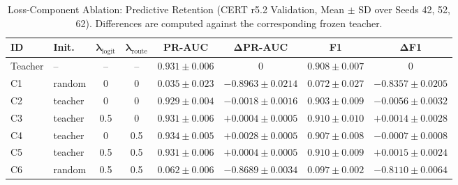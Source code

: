 \begin{table}[!t]
\caption{Loss-Component Ablation: Predictive Retention (CERT r5.2 Validation,
Mean $\pm$ SD over Seeds 42, 52, 62). Differences are computed against the
corresponding frozen teacher.}
\label{tab:loss_ablation_predictive}
\centering
\footnotesize
\renewcommand{\arraystretch}{1.15}
\setlength{\tabcolsep}{4pt}
\begin{tabular*}{\textwidth}{@{\extracolsep{\fill}}llcccccc@{}}
\hline
\textbf{ID} & \textbf{Init.} &
\(\boldsymbol{\lambda_{\mathrm{logit}}}\) &
\(\boldsymbol{\lambda_{\mathrm{route}}}\) &
\textbf{PR-AUC} & $\boldsymbol{\Delta}$\textbf{PR-AUC} &
\textbf{F1} & $\boldsymbol{\Delta}$\textbf{F1} \\
\hline
Teacher & --      & --  & --  & $0.931\pm0.006$ & $0$                & $0.908\pm0.007$ & $0$                \\
C1      & random  & 0   & 0   & $0.035\pm0.023$ & $-0.8963\pm0.0214$ & $0.072\pm0.027$ & $-0.8357\pm0.0205$ \\
C2      & teacher & 0   & 0   & $0.929\pm0.004$ & $-0.0018\pm0.0016$ & $0.903\pm0.009$ & $-0.0056\pm0.0032$ \\
C3      & teacher & 0.5 & 0   & $0.931\pm0.006$ & $+0.0004\pm0.0005$ & $0.910\pm0.010$ & $+0.0014\pm0.0028$ \\
C4      & teacher & 0   & 0.5 & $0.934\pm0.005$ & $+0.0028\pm0.0005$ & $0.907\pm0.008$ & $-0.0007\pm0.0008$ \\
C5      & teacher & 0.5 & 0.5 & $0.931\pm0.006$ & $+0.0004\pm0.0005$ & $0.910\pm0.009$ & $+0.0015\pm0.0024$ \\
C6      & random  & 0.5 & 0.5 & $0.062\pm0.006$ & $-0.8689\pm0.0034$ & $0.097\pm0.002$ & $-0.8110\pm0.0064$ \\
\hline
\end{tabular*}
\end{table}


